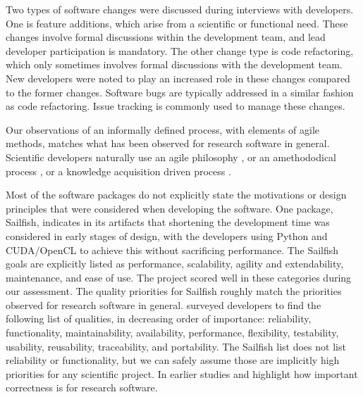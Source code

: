 \documentclass[final, 3p, times, authoryear]{elsarticle}
\begin{document}
Two types of software changes were discussed during interviews with developers.
One is feature additions, which arise from a scientific or functional need.
These changes involve formal discussions within the development team, and lead
developer participation is mandatory. The other change type is code refactoring,
which only sometimes involves formal discussions with the development team. New
developers were noted to play an increased role in these changes compared to the
former changes. Software bugs are typically addressed in a similar fashion as
code refactoring.  Issue tracking is commonly used to manage these changes.

Our observations of an informally defined process, with elements of agile
methods, matches what has been observed for research software in general.
Scientific developers naturally use an agile philosophy \citep{AckroydEtAl2008,
CarverEtAl2007, EasterbrookAndJohns2009, Segal2005, HeatonAndCarver2015}, or an
amethododical process \citep{Kelly2013}, or a knowledge acquisition driven
process \citep{Kelly2015}.

Most of the software packages do not explicitly state the motivations or design
principles that were considered when developing the software. One package,
Sailfish, indicates in its artifacts that shortening the development time was
considered in early stages of design, with the developers using Python and
CUDA/OpenCL to achieve this without sacrificing performance. The Sailfish goals
are explicitly listed as performance, scalability, agility and extendability,
maintenance, and ease of use. The project scored well in these categories during
our assessment.  The quality priorities for Sailfish roughly match the
priorities observed for research software in general.
\citet{Nguyen-HoanEtAl2010} surveyed developers to find the following list of
qualities, in decreasing order of importance: reliability, functionality,
maintainability, availability, performance, flexibility, testability, usability,
reusability, traceability, and portability. The Sailfish list does not list
reliability or functionality, but we can safely assume those are implicitly high
priorities for any scientific project.  In earlier studies
\citet{KellyAndSanders2008} and \citet{CarverEtAl2007} highlight how important
correctness is for research software.
\end{document}
